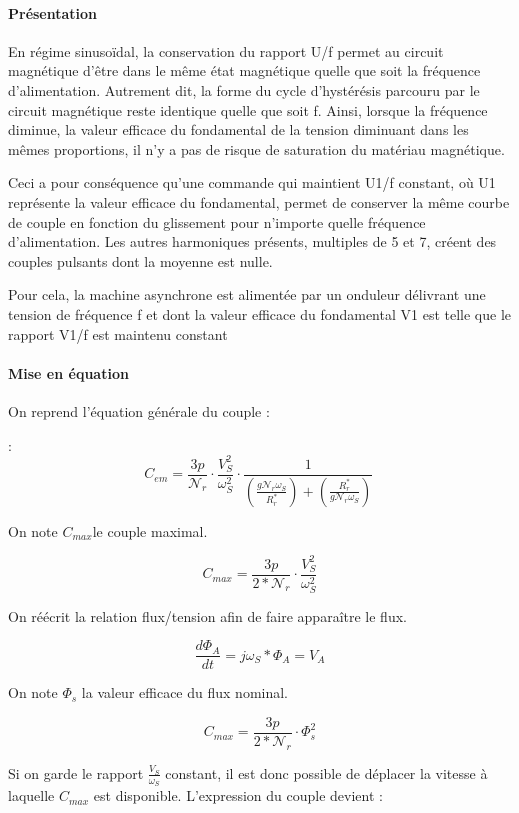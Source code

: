 \documentclass[main.tex]{subfiles}
\begin{document}
\paragraph{Présentation}

En régime sinusoïdal, la conservation du rapport U/f permet au circuit magnétique d'être dans le même état magnétique quelle que soit la fréquence d'alimentation. Autrement dit, la forme du cycle d'hystérésis parcouru par le circuit magnétique reste identique quelle que soit f. Ainsi, lorsque la fréquence diminue, la valeur efficace du fondamental de la tension diminuant dans les mêmes proportions, il n'y a pas de risque de saturation du matériau magnétique.

Ceci a pour conséquence qu'une commande qui maintient U1/f constant, où U1 représente la valeur efficace du fondamental, permet de conserver la même courbe de couple en fonction du glissement pour n'importe quelle fréquence d'alimentation. Les autres harmoniques présents, multiples de 5 et 7, créent des couples pulsants dont la moyenne est nulle.

Pour cela, la machine asynchrone est alimentée par un onduleur délivrant une tension de fréquence f et dont la valeur efficace du fondamental V1 est telle que le rapport V1/f est maintenu constant

\paragraph{Mise en équation}

On reprend l'équation générale du couple :

:\[ C_{em}= \frac{3 p}{\mathcal{N}_r} \cdot \frac{V_S^2}{ \omega_S^2} \cdot  \frac{1}{\left(\frac{g \mathcal{N}_r \omega_S}{R_r^*}\right)+ \left(\frac{R_r^* }{g \mathcal{N}_r \omega_S }\right)} \,\]

On note $ C_{max} $le couple maximal.

\[ C_{max}=\frac{3 p}{2*\mathcal{N}_r} \cdot \frac{V_S^2}{ \omega_S^2} \]

On réécrit la relation flux/tension afin de faire apparaître le flux.

\[\frac{d\Phi_A}{dt}=j \omega_S * \Phi_A = V_A \]

On note $ \Phi_s$ la valeur efficace du flux nominal.

\[ C_{max}=\frac{3 p}{2*\mathcal{N}_r} \cdot \Phi_s^2 \]

Si on garde le rapport $\frac{V_S}{ \omega_S}$ constant, il est donc possible de déplacer la vitesse à laquelle $ C_{max}$ est disponible. L'expression du couple devient :
\end{document}
